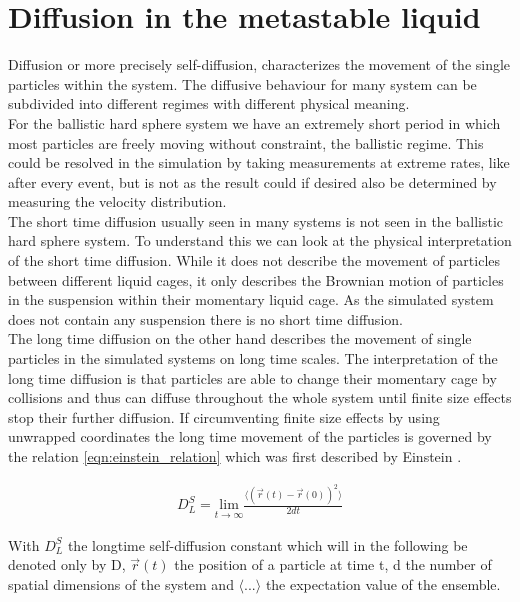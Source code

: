 \section{Diffusion in the metastable liquid}
\label{sec:diffusion_metastable_liquid}
Diffusion or more precisely self-diffusion, characterizes the movement of the single particles within the system. The diffusive behaviour for many system can be subdivided into different regimes with different physical meaning.\\ 

For the ballistic hard sphere system we have an extremely short period in which most particles are freely moving without constraint, the ballistic regime. This could be resolved in the simulation by taking measurements at extreme rates, like after every event, but is not as the result could if desired also be determined by measuring the velocity distribution.\\ 

The short time diffusion usually seen in many systems is not seen in the ballistic hard sphere system. To understand this we can look at the physical interpretation of the short time diffusion. While it does not describe the movement of particles between different liquid cages, it only describes the Brownian motion of particles in the suspension within their momentary liquid cage. As the simulated system does not contain any suspension there is no short time diffusion.\\

The long time diffusion on the other hand describes the movement of single particles in the simulated systems on long time scales. The interpretation of the long time diffusion is that particles are able to change their momentary cage by collisions and thus can diffuse throughout the whole system until finite size effects stop their further diffusion. If circumventing finite size effects by using unwrapped coordinates the long time movement of the particles is governed by the relation \autoref{eqn:einstein_relation} which was first described by Einstein .

\begin{align}
\label{eqn:einstein_relation}
D^S_L = \underset{t\rightarrow \infty}{\text{lim}} \frac{\langle (\vec{r}(t) - \vec{r}(0) )^2 \rangle}{2 d t}
\end{align}

With $D^S_L$ the longtime self-diffusion constant which will in the following be denoted only by D, $\vec{r}(t)$ the position of a particle at time t, d the number of spatial dimensions of the system and $\langle ... \rangle$ the expectation value of the ensemble.\\

